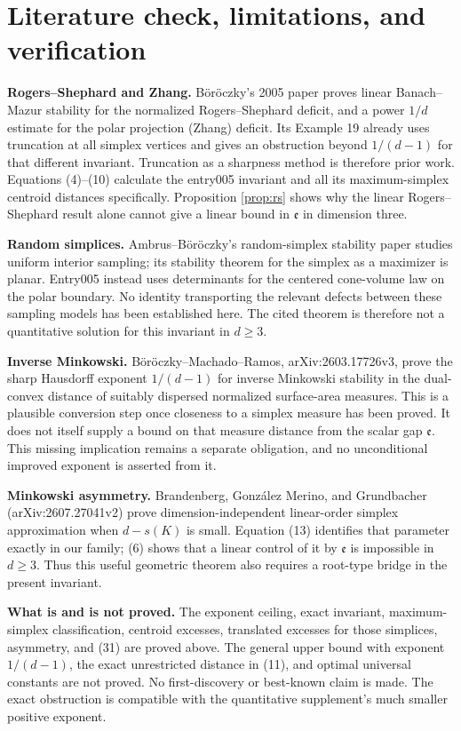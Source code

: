\documentclass[11pt]{article}
\newcommand{\ee}{\mathfrak e}
\begin{document}
\section{Literature check, limitations, and verification}

\noindent\textbf{Rogers--Shephard and Zhang.}
B\"or\"oczky's 2005 paper proves linear Banach--Mazur stability for the
normalized Rogers--Shephard deficit, and a power $1/d$ estimate for the
polar projection (Zhang) deficit. Its Example 19 already uses truncation at
all simplex vertices and gives an obstruction beyond $1/(d-1)$ for that
different invariant. Truncation as a sharpness method is therefore prior
work. Equations (4)--(10) calculate the entry005 invariant and all its
maximum-simplex centroid distances specifically. Proposition \ref{prop:rs} shows why
the linear Rogers--Shephard result alone cannot give a linear bound in
$\ee$ in dimension three.

\medskip\noindent\textbf{Random simplices.}
Ambrus--B\"or\"oczky's random-simplex stability paper studies uniform
interior sampling; its stability theorem for the simplex as a maximizer is planar.
Entry005 instead uses determinants for the centered cone-volume law on
the polar boundary. No identity transporting the relevant defects between
these sampling models has been established here. The cited theorem is
therefore not a quantitative solution for this invariant in $d\ge3$.

\medskip\noindent\textbf{Inverse Minkowski.}
B\"or\"oczky--Machado--Ramos, arXiv:2603.17726v3, prove the sharp
Hausdorff exponent $1/(d-1)$ for inverse Minkowski stability in the
dual-convex distance of suitably dispersed normalized surface-area measures.
This is a plausible conversion step once closeness to a simplex measure
has been proved. It does not itself supply a bound on that measure distance
from the scalar gap $\ee$. This missing implication remains a separate
obligation, and no unconditional improved exponent is asserted from it.

\medskip\noindent\textbf{Minkowski asymmetry.}
Brandenberg, Gonz\'alez Merino, and Grundbacher (arXiv:2607.27041v2)
prove dimension-independent linear-order simplex approximation when
$d-s(K)$ is small. Equation (13) identifies that parameter exactly in
our family; (6) shows that a linear control of it by $\ee$ is impossible
in $d\ge3$. Thus this useful geometric theorem also requires a root-type
bridge in the present invariant.

\medskip\noindent\textbf{What is and is not proved.}
The exponent ceiling, exact invariant, maximum-simplex classification,
centroid excesses, translated excesses for those simplices, asymmetry,
and (31) are proved above. The general upper bound with exponent
$1/(d-1)$, the exact unrestricted distance in (11), and optimal universal
constants are not proved. No first-discovery or best-known claim is made.
The exact obstruction is compatible with the quantitative supplement's much smaller
positive exponent.
\end{document}
